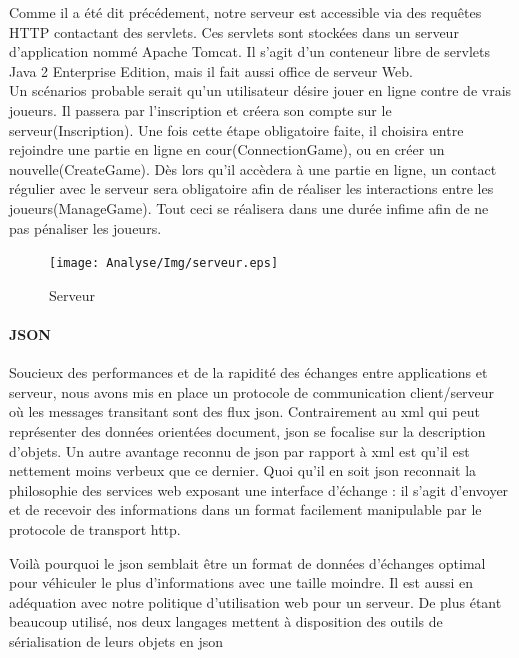 		
		Comme il a été dit précédement, notre serveur est accessible via des requêtes
		HTTP contactant des servlets. Ces servlets sont stockées dans un serveur
		d'application nommé Apache Tomcat. Il s'agit d'un conteneur libre de
		servlets Java 2 Enterprise Edition, mais il fait aussi office de serveur
		Web.\\
		Un scénarios probable serait qu'un utilisateur désire jouer
		en ligne contre de vrais joueurs. 
		Il passera par l'inscription et créera son compte sur le
		serveur(Inscription). Une fois cette étape obligatoire faite, il choisira
		entre rejoindre une partie en ligne en cour(ConnectionGame), ou en créer un nouvelle(CreateGame).
		Dès lors qu'il accèdera à une partie en
		ligne, un contact régulier avec le serveur sera obligatoire afin de réaliser
		les interactions entre les joueurs(ManageGame). Tout ceci se
		réalisera dans une durée infime afin de ne pas pénaliser les joueurs.	
		
		\begin{figure}
			\texttt{[image: Analyse/Img/serveur.eps]}
			 \caption {Serveur}
		\end{figure}
		
		\newpage
		
		
	\paragraph{JSON\\}	
		Soucieux des performances et de la rapidité des échanges entre applications et
		serveur, nous avons mis en place un protocole de communication client/serveur
		où les messages transitant sont des flux \gls{json}. 	
		Contrairement au \gls{xml} qui peut représenter des données orientées document,
		\gls{json} se focalise sur la description d’objets.
		Un autre avantage reconnu de \gls{json} par rapport à \gls{xml} est qu’il est nettement
		moins verbeux que ce dernier.
		Quoi qu’il en soit \gls{json} reconnait la philosophie des services web exposant
		une interface d’échange : il s’agit
		d’envoyer et de recevoir des informations dans un format facilement manipulable par
		le protocole de transport \gls{http}.
		
		
		Voilà pourquoi le \gls{json} semblait être un format de données d'échanges optimal
		pour véhiculer le plus d'informations avec une taille moindre. Il est aussi en
		adéquation avec notre politique d'utilisation web pour un serveur.
		De plus étant beaucoup utilisé, nos deux
		langages mettent à disposition des outils de sérialisation de leurs objets en \gls{json}
		
